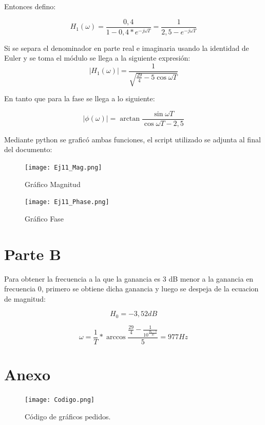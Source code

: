 Entonces defino:

\begin{equation}
H_1(\omega) = \frac{0,4}{1 - 0,4*e^{-j\omega T}} = \frac{1}{2,5 - e^{-j\omega T}}
\end{equation}

Si se separa el denominador en parte real e imaginaria usando la identidad de Euler y se toma el módulo se llega a la siguiente expresión:
\begin{equation}
    |H_1(\omega)| = \frac{1}{\sqrt{\frac{29}{4} - 5\cos{\omega T}}}
\end{equation}

En tanto que para la fase se llega a lo siguiente:

\begin{equation}
    |\phi(\omega)| = \arctan{\frac{\sin{\omega T}}{\cos{\omega T} - 2,5}}
\end{equation}{}

Mediante python se graficó ambas funciones, el script utilizado se adjunta al final del documento:

\begin{figure}[H]
  \centering
  \begin{minipage}[b]{0.4\textwidth}
    \texttt{[image: Ej11\_Mag.png]}
    \caption{Gráfico Magnitud}
  \end{minipage}
  \hfill
  \begin{minipage}[b]{0.4\textwidth}
    \texttt{[image: Ej11\_Phase.png]}
    \caption{Gráfico Fase}
  \end{minipage}
\end{figure}

\section{Parte B}

Para obtener la frecuencia a la que la ganancia es 3 dB menor a la ganancia en frecuencia 0, primero se obtiene dicha ganancia y luego se despeja de la ecuacion de magnitud: 

\begin{equation}
    H_0 = -3,52dB
\end{equation}{}

\begin{equation}
    \omega = \frac{1}{T} * \arccos{\frac{\frac{29}{4} - \frac{1}{10^{\frac{H_0 - 3}{10}}}}{5}} = 977 Hz
\end{equation}{}

\section{Anexo}

\begin{figure}[H]
    \centering
    \texttt{[image: Codigo.png]}
    \caption{Código de gráficos pedidos.}
    \label{fig:my_label}
\end{figure}{}
